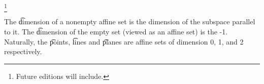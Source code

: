 
\footnote{Future editions will include.}


The \t{dimension} of a nonempty affine set is the dimension of the subspace parallel to it.
The \t{dimension} of the empty set (viewed as an affine set) is the -1.
Naturally, the \t{points}, \t{lines} and \t{planes} are affine sets of dimension 0, 1, and 2 respectively.

\blankpage
